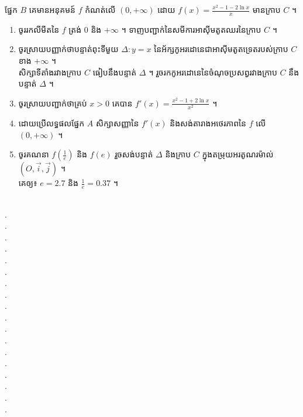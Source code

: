\documentclass{officialexam}
\begin{document}
\begin{enumerate}[I]
		{\color{khtug} \sffamily ផ្នែក $B$} គេមានអនុគមន៍ $f$ កំណត់លើ $(0,+\infty)$ ដោយ $f(x)=\frac{x^2-1-2\ln x}{x}$ មានក្រាប $C$ ។
		\begin{enumerate}[k]
			\item ចូររកលីមីតនៃ $f$ ត្រង់ $0$ និង $+\infty$ ។ ទាញបញ្ជាក់នៃសមីការអាស៊ីមតូតឈរនៃក្រាប $C$ ។
			\item ចូរស្រាយបញ្ញាក់ថាបន្ទាត់ពុះទីមួយ $\Delta : y=x$ នៃអ័ក្សកូអរដោនេជាអាស៊ីមតូតទ្រេតរបស់ក្រាប $C$ ខាង $+\infty$ ។ \\សិក្សាទីតាំងរវាងក្រាប $C$ ធៀបនឹងបន្ទាត់ $\Delta$ ។ រួចរកកូអរដោនេនៃចំណុចប្រសព្វរវាងក្រាប $C$ នឹង បន្ទាត់ $\Delta$ ។
			\item ចូរស្រាយបញ្ជាក់ថាគ្រប់ $x>0$ គេបាន $f'(x)=\frac{x^2-1+2\ln x}{x^2}$ ។
			\item ដោយប្រើលទ្ធផលផ្នែក $A$ សិក្សាសញ្ញានៃ $f'(x)$ និងសង់តារាងអថេរភាពនៃ $f$ លើ $(0, +\infty)$ ។
			\item ចូរគណនា $f\left(\frac{1}{e}\right)$ និង $f(e)$ រួចសង់បន្ទាត់ $\Delta$ និងក្រាប $C$ ក្នុងតម្រុយអរតូណរម៉ាល់ $(O, \vec{i}, \vec{j})$ ។\\
			គេឲ្យ៖ $e=2.7$ និង $ \frac{1}{e}=0.37$ ។
		\end{enumerate}
	\end{enumerate}
\borderline{\bigg[សូមសំណាងល្អគ្រប់ៗគ្នា!\bigg]}\\
{\color{white}.}\dotfill\\
{\color{white}.}\dotfill\\
{\color{white}.}\dotfill\\
{\color{white}.}\dotfill\\
{\color{white}.}\dotfill\\
{\color{white}.}\dotfill\\
{\color{white}.}\dotfill\\
{\color{white}.}\dotfill\\
{\color{white}.}\dotfill\\
{\color{white}.}\dotfill\\
{\color{white}.}\dotfill\\
{\color{white}.}\dotfill\\
{\color{white}.}\dotfill\\
{\color{white}.}\dotfill\\
{\color{white}.}\dotfill\\
{\color{white}.}\dotfill\\
{\color{white}.}\dotfill\\
{\color{white}.}\dotfill
\newpage
{\maketitle}
\end{document}
